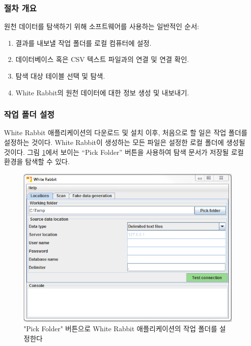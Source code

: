 \documentclass[10.5pt]{book}
\providecommand{\tightlist}{%
  \setlength{\itemsep}{0pt}\setlength{\parskip}{0pt}}
\theoremstyle{definition}
\theoremstyle{definition}
\theoremstyle{definition}
\theoremstyle{remark}
\begin{document}
\subsubsection*{절차 개요}\label{-}

원천 데이터를 탐색하기 위해 소프트웨어를 사용하는 일반적인 순서:

\begin{enumerate}
\def\labelenumi{\arabic{enumi}.}
\tightlist
\item
  결과를 내보낼 작업 폴더를 로컬 컴퓨터에 설정.
\item
  데이터베이스 혹은 CSV 텍스트 파일과의 연결 및 연결 확인.
\item
  탐색 대상 테이블 선택 및 탐색.
\item
  White Rabbit의 원천 데이터에 대한 정보 생성 및 내보내기.
\end{enumerate}

\subsubsection*{작업 폴더 설정}\label{--}

White Rabbit 애플리케이션의 다운로드 및 설치 이후, 처음으로 할 일은 작업
폴더를 설정하는 것이다. White Rabbit이 생성하는 모든 파일은 설정한 로컬
폴더에 생성될 것이다. 그림 \ref{fig:WhiteRabbitLocation}에서 보이는
``Pick Folder'' 버튼을 사용하여 탐색 문서가 저장될 로컬 환경을 탐색할 수
있다.

\begin{figure}

{\centering \includegraphics[width=1\linewidth]{images/ExtractTransformLoad/WhiteRabbitLocation} 

}

\caption{"Pick Folder" 버튼으로 White Rabbit 애플리케이션의 작업 폴더를 설정한다}\label{fig:WhiteRabbitLocation}
\end{figure}
\end{document}

